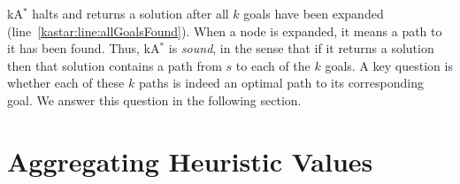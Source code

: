 \documentclass[smallextended]{svjour3}       %
\newcommand{\kastar}{kA$^*$\xspace}
\newcommand{\open}{\textsc{Open}\xspace}
\newcommand{\roni}[1]{\textbf{[RS:#1]}}
\begin{document}
\kastar halts and returns a solution after all $k$ goals have been expanded (line~\ref{kastar:line:allGoalsFound}).
When a node is expanded, it means a path to it has been found.
Thus, \kastar is \emph{sound}, in the sense that if it returns a solution then that solution contains a path from $s$ to each of the $k$ goals. 
A key question is whether each of these $k$ paths is indeed an optimal path to its corresponding goal. 
We answer this question in the following section. 





\section{Aggregating Heuristic Values}
\label{sec:aggregating}
\end{document}
